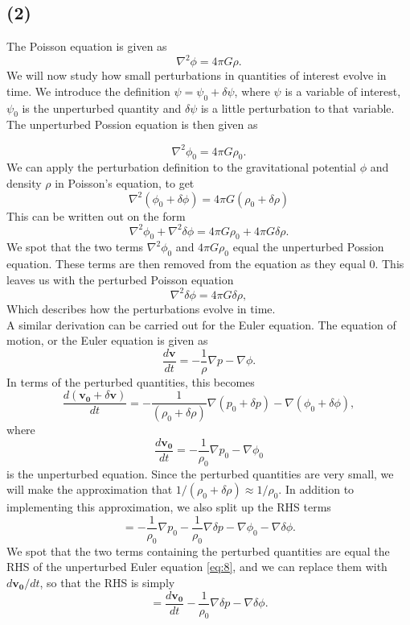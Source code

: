 \documentclass[a4paper]{article}
\begin{document}
\subsection*{(2)}

The Poisson equation is given as
\begin{equation}\label{eq:4}
\nabla^2 \phi = 4 \pi G \rho.
\end{equation}
We will now study how small perturbations in quantities of interest evolve in time. We introduce the definition $\psi = \psi_0 +\delta \psi$, where $\psi$ is a variable of interest, $\psi_0$ is the unperturbed quantity and $\delta \psi$ is a little perturbation to that variable. The unperturbed Possion equation is then given as

\begin{equation}\label{eq:5}
\nabla^2 \phi_0 = 4 \pi G \rho_0.
\end{equation}
We can apply the perturbation definition to the gravitational potential $\phi$ and density $\rho$ in Poisson's equation, to get
\[
\nabla^2 (\phi_0 + \delta \phi) = 4\pi G (\rho_0 + \delta \rho)
\]
This can be written out on the form
\[
\nabla^2 \phi_0 + \nabla^2 \delta \phi = 4 \pi G \rho_0 +4 \pi G \delta \rho.
\]
We spot that the two terms $\nabla^2 \phi_0$ and $4 \pi G \rho_0$ equal the unperturbed Possion equation. These terms are then removed from the equation as they equal 0. This leaves us with the perturbed Poisson equation
\begin{equation}\label{eq:6}
\nabla^2 \delta \phi = 4 \pi G \delta \rho,
\end{equation}
Which describes how the perturbations evolve in time.
\\

A similar derivation can be carried out for the Euler equation. The equation of motion, or the Euler equation is given as
\begin{equation}\label{eq:7}
    \frac{d \mathbf{v}}{dt} = - \frac{1}{\rho} \nabla p - \nabla \phi.
\end{equation}
In terms of the perturbed quantities, this becomes
\[
    \frac{d (\mathbf{v_0} + \delta \mathbf{v})}{dt} = - \frac{1}{(\rho_0 + \delta \rho)} \nabla (p_0 + \delta p) - \nabla (\phi_0 + \delta \phi),
\]
where 
\begin{equation}\label{eq:8}
    \frac{d\mathbf{v_0}}{dt} = - \frac{1}{\rho_0} \nabla p_0  - \nabla \phi_0
\end{equation}
is the unperturbed equation.
Since the perturbed quantities are very small, we will make the approximation that $1/(\rho_0+ \delta \rho) \approx 1/\rho_0$. In addition to implementing this approximation, we also split up the RHS terms
\[
= - \frac{1}{\rho_0} \nabla p_0 - \frac{1}{\rho_0} \nabla \delta p - \nabla \phi_0 - \nabla \delta \phi.
\]
We spot that the two terms containing the perturbed quantities are equal the RHS of the unperturbed Euler equation \eqref{eq:8}, and we can replace them with $d\mathbf{v_0}/dt$, so that the RHS is simply
\[
= \frac{d\mathbf{v_0}}{dt} - \frac{1}{\rho_0} \nabla \delta p  - \nabla \delta \phi.
\]
\end{document}
